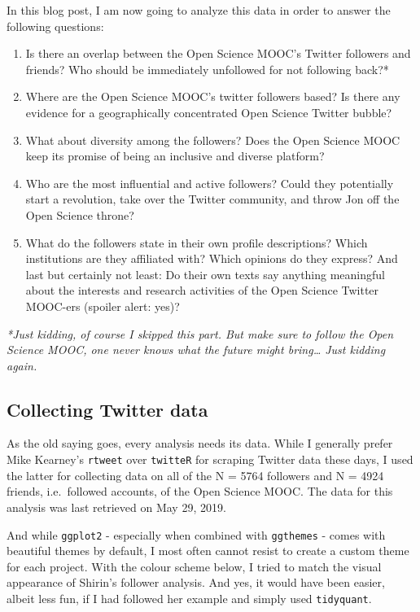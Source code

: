 \documentclass[]{article}
\providecommand{\tightlist}{%
  \setlength{\itemsep}{0pt}\setlength{\parskip}{0pt}}
\begin{document}
In this blog post, I am now going to analyze this data in order to
answer the following questions:

\begin{enumerate}
\def\labelenumi{\arabic{enumi})}
\tightlist
\item
  Is there an overlap between the Open Science MOOC's Twitter followers
  and friends? Who should be immediately unfollowed for not following
  back?*
\item
  Where are the Open Science MOOC's twitter followers based? Is there
  any evidence for a geographically concentrated Open Science Twitter
  bubble?
\item
  What about diversity among the followers? Does the Open Science MOOC
  keep its promise of being an inclusive and diverse platform?
\item
  Who are the most influential and active followers? Could they
  potentially start a revolution, take over the Twitter community, and
  throw Jon off the Open Science throne?
\item
  What do the followers state in their own profile descriptions? Which
  institutions are they affiliated with? Which opinions do they express?
  And last but certainly not least: Do their own texts say anything
  meaningful about the interests and research activities of the Open
  Science Twitter MOOC-ers (spoiler alert: yes)?
\end{enumerate}

\emph{*Just kidding, of course I skipped this part. But make sure to
follow the Open Science MOOC, one never knows what the future might
bring\ldots{} Just kidding again.}

\subsection{Collecting Twitter data}\label{collecting-twitter-data}

As the old saying goes, every analysis needs its data. While I generally
prefer Mike Kearney's \texttt{rtweet} over \texttt{twitteR} for scraping
Twitter data these days, I used the latter for collecting data on all of
the N = 5764 followers and N = 4924 friends, i.e.~followed accounts, of
the Open Science MOOC. The data for this analysis was last retrieved on
May 29, 2019.

And while \texttt{ggplot2} - especially when combined with
\texttt{ggthemes} - comes with beautiful themes by default, I most often
cannot resist to create a custom theme for each project. With the colour
scheme below, I tried to match the visual appearance of Shirin's
follower analysis. And yes, it would have been easier, albeit less fun,
if I had followed her example and simply used \texttt{tidyquant}.
\end{document}
